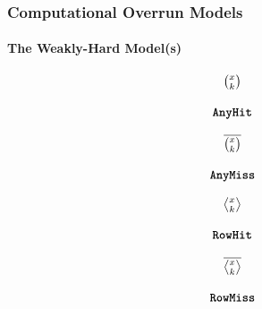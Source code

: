 \begin{frame}
    \frametitle{Computational Overrun Models}
    \framesubtitle{The Weakly-Hard Model(s)}
    \begin{minipage}[c]{0.24\textwidth}
        \centering
        \begin{equation*}
            \begin{matrix}
                {\Large \binom{x_{}}{k_{}}}   \\
                            \\
                \texttt{\textbf{AnyHit}}{}
            \end{matrix}
        \end{equation*}
    \end{minipage}\hfill
    \begin{minipage}[c]{0.24\textwidth}
        \centering
        \begin{equation*}
            \begin{matrix}
                {\Large \overline{\binom{x_{}}{k_{}}}}   \\
                            \\
                \texttt{\textbf{AnyMiss}}{}
            \end{matrix}
        \end{equation*}
    \end{minipage}\hfill
    \begin{minipage}[c]{0.24\textwidth}
        \centering
        \begin{equation*}
            \begin{matrix}
                {\Large \rowhit{}}   \\
                            \\
                \tRH{}
            \end{matrix}
        \end{equation*}
    \end{minipage}\hfill
    \begin{minipage}[c]{0.24\textwidth}
        \centering
        \begin{equation*}
            \begin{matrix}
                {\Large \rowmiss{}}   \\
                            \\
                \tRM{}
            \end{matrix}
        \end{equation*}
    \end{minipage}

    \vspace{1cm}


\end{frame}
